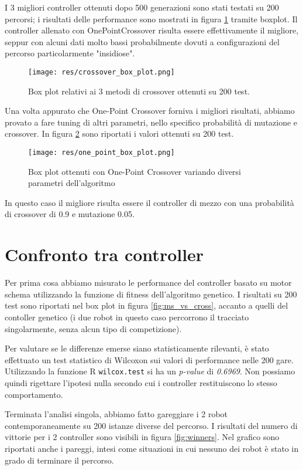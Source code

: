 \documentclass[UTF8]{article}
\begin{document}
I 3 migliori controller ottenuti dopo 500 generazioni sono stati testati su 200 percorsi; i risultati delle performance sono mostrati in figura \ref{fig:crossover_box_plot} tramite boxplot. Il controller allenato con OnePointCrossover risulta essere effettivamente il migliore, seppur con alcuni dati molto bassi probabilmente dovuti a configurazioni del percorso particolarmente "insidiose". 
\begin{figure}[h]
\centering
\texttt{[image: res/crossover\_box\_plot.png]}
\caption{Box plot relativi ai 3 metodi di crossover ottenuti su 200 test. }
\label{fig:crossover_box_plot}
\end{figure}
Una volta appurato che One-Point Crossover forniva i migliori risultati, abbiamo provato a fare tuning di altri parametri, nello specifico probabilità di mutazione e crossover. In figura \ref{fig:one_point_box_plot} sono riportati i valori ottenuti su 200 test.
\begin{figure}[h]
\centering
\texttt{[image: res/one\_point\_box\_plot.png]}
\caption{Box plot ottenuti con One-Point Crossover variando diversi parametri dell'algoritmo}
\label{fig:one_point_box_plot}
\end{figure}
In questo caso il migliore risulta essere il controller di mezzo con una probabilità di crossover di 0.9 e mutazione 0.05.

\section{Confronto tra controller}
Per prima cosa abbiamo misurato le performance del controller basato su motor schema utilizzando la funzione di fitness dell'algoritmo genetico. I risultati su 200 test sono riportati nel box plot in figura \ref{fig:ms_vs_cross}, accanto a quelli del contoller genetico (i due robot in questo caso percorrono il tracciato singolarmente, senza alcun tipo di competizione).

Per valutare se le differenze emerse siano statisticamente rilevanti, è stato effettuato un test statistico di Wilcoxon sui valori di performance nelle 200 gare.
Utilizzando la funzione R \texttt{wilcox.test} si ha un \textit{p-value} di \textit{0.6969}. 
Non possiamo quindi rigettare l'ipotesi nulla secondo cui i controller restituiscono lo stesso comportamento.

Terminata l'analisi singola, abbiamo fatto gareggiare i 2 robot contemporaneamente su 200 istanze diverse del percorso. I risultati del numero di vittorie per i 2 controller sono visibili in figura \ref{fig:winners}. Nel grafico sono riportati anche i pareggi, intesi come situazioni in cui nessuno dei robot è stato in grado di terminare il percorso.
\end{document}
